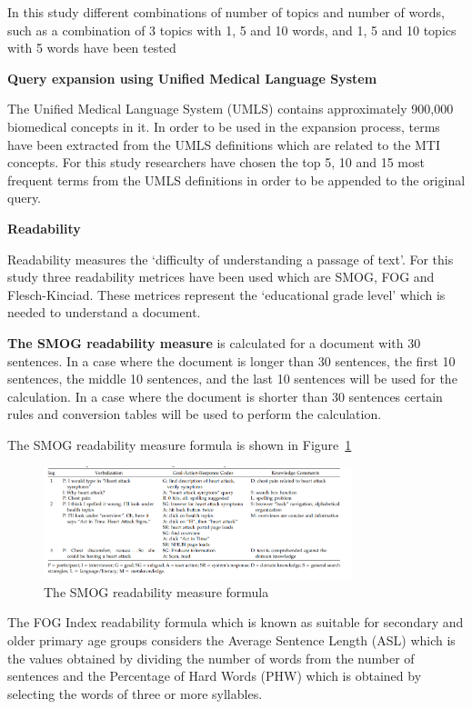 \documentclass[]{article}
\begin{document}
In this study different combinations of number of topics and number of words, such as a combination of 3 topics with 1, 5 and 10 words, and 1, 5 and 10 topics with 5 words have been tested 
 
\textbf{Query expansion using Unified Medical Language System} 

The Unified Medical Language System (UMLS) contains approximately 900,000 biomedical concepts in it. In order to be used in the expansion process, terms have been extracted from the UMLS definitions which are related to the MTI concepts. For this study researchers have chosen the top 5, 10 and 15 most frequent terms from the UMLS definitions in order to be appended to the original query.   

\textbf{Readability}

Readability measures the ‘difficulty of understanding a passage of text’. For this study three readability metrices have been used which are SMOG, FOG and Flesch-Kinciad. These metrices represent the ‘educational grade level’ which is needed to understand a document.   

\textbf{The SMOG readability measure} is calculated for a document with 30 sentences. In a case where the document is longer than 30 sentences, the first 10 sentences, the middle 10 sentences, and the last 10 sentences will be used for the calculation. In a case where the document is shorter than 30 sentences certain rules and conversion tables will be used to perform the calculation.  

The SMOG readability measure formula is shown in Figure~\ref{fig14} 

\begin{figure}[b!]
	\includegraphics[width=0.8\textwidth]{Capture14.png}
	\caption{The SMOG readability measure formula \label{fig14}}
\end{figure}

The FOG Index readability formula which is known as suitable for secondary and older primary age groups considers the Average Sentence Length (ASL) which is the values obtained by dividing the number of words from the number of sentences and the Percentage of Hard Words (PHW) which is obtained by selecting the words of three or more syllables.    
\end{document}
